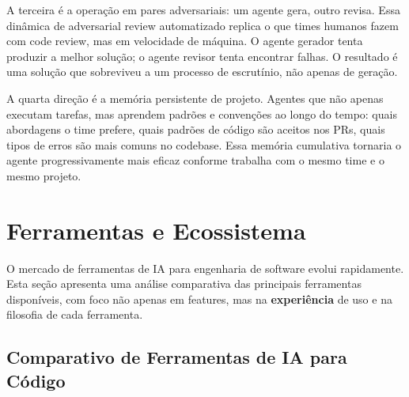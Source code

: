 A terceira é a operação em pares adversariais: um agente gera, outro revisa. Essa
dinâmica de adversarial review automatizado replica o que times humanos fazem com code
review, mas em velocidade de máquina. O agente gerador tenta produzir a melhor
solução; o agente revisor tenta encontrar falhas. O resultado é uma solução que
sobreviveu a um processo de escrutínio, não apenas de geração.

A quarta direção é a memória persistente de projeto. Agentes que não apenas executam
tarefas, mas aprendem padrões e convenções ao longo do tempo: quais abordagens o
time prefere, quais padrões de código são aceitos nos PRs, quais tipos de erros são
mais comuns no codebase. Essa memória cumulativa tornaria o agente progressivamente
mais eficaz conforme trabalha com o mesmo time e o mesmo projeto.

\section{Ferramentas e Ecossistema}

O mercado de ferramentas de IA para engenharia de software evolui
rapidamente. Esta seção apresenta uma análise comparativa das principais
ferramentas disponíveis, com foco não apenas em features, mas na
\textbf{experiência} de uso e na filosofia de cada ferramenta.

\subsection{Comparativo de Ferramentas de IA para Código}

